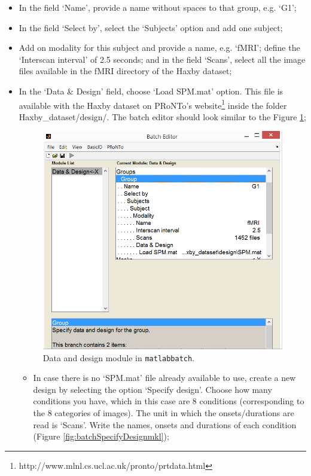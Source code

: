 \begin{itemize}
\begin{itemize}
		\item In the field `Name', provide a name without spaces to that group, e.g. `G1'; 
		
		\item In the field `Select by', select the `Subjects' option and add one subject;
		
		\item Add on modality for this subject and provide a name, e.g. `fMRI'; define the `Interscan interval' of 2.5 seconds; and in the field `Scans', select all the image files available in the fMRI directory of the Haxby dataset;	
		
		\item In the `Data \& Design' field, choose `Load SPM.mat' option. This file is available with the Haxby dataset on PRoNTo's website\footnote{http://www.mlnl.cs.ucl.ac.uk/pronto/prtdata.html} inside the folder Haxby\_dataset/design/. The batch editor should look similar to the Figure \ref{fig:batchGroupsmkl};	
		
		\begin{figure}[!h]
	\centering
		\includegraphics[scale=0.6]{images/Tutorial/mkl/batchGroupsmkl.png}
	\caption{Data and design module in {\tt matlabbatch}. }
	\label{fig:batchGroupsmkl}
	\end{figure}
				
		
		\begin{itemize}
	
			\item In case there is no `SPM.mat' file already available to use, create a new 	design by selecting the option `Specify design'. Choose how many conditions you have, which in this case are 8 conditions (corresponding to the 8 categories of images). The unit in which the onsets/durations are read is `Scans'. Write the names, onsets and durations of each condition (Figure \ref{fig:batchSpecifyDesignmkl});
	

\end{itemize}
\end{itemize}
\end{itemize}
